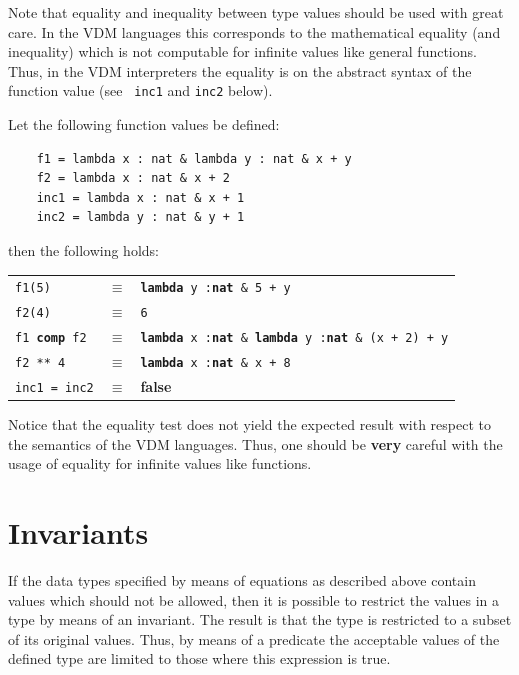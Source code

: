 \documentclass{overturerepchap}
\newcommand{\keyw}[1]{{\bf\ttfamily #1}}
\begin{document}
\begin{description}
  Note that equality and inequality between type values should be used
  with great care. In the VDM languages this corresponds to the
  mathematical equality (and inequality) which is not computable for
  infinite values like general functions. Thus, in the
  VDM interpreters the
  equality is on the abstract syntax of the function value (see {\tt
    inc1} and {\tt inc2} below).



\item[Examples:] Let the following function values be defined:
  \begin{lstlisting}
    f1 = lambda x : nat & lambda y : nat & x + y
    f2 = lambda x : nat & x + 2
    inc1 = lambda x : nat & x + 1
    inc2 = lambda y : nat & y + 1
  \end{lstlisting}
  then the following holds:

  \begin{tabular}{lcl}
    {\tt f1(5)} &$\equiv$& {\tt \keyw{lambda} y :\keyw{nat} \& 5 + y}\\
    {\tt f2(4)} &$\equiv$& {\tt 6}\\
    {\tt f1 \keyw{comp} f2}&$\equiv$& {\tt \keyw{lambda} x :\keyw{nat} \&
      \keyw{lambda} y :\keyw{nat} \& (x + 2) + y}\\
    {\tt f2 ** 4}&$\equiv$& {\tt \keyw{lambda} x :\keyw{nat} \& x + 8}\\
    {\tt inc1 = inc2}&$\equiv$& \keyw{false}\\
  \end{tabular}

  Notice that the equality test does not yield the expected result with
  respect to the semantics of the VDM languages. Thus, one should
  be {\bf very} careful with the usage of equality for infinite values
  like functions.
\end{description}

\section{Invariants}\label{inv}

If the data types specified by means of equations as described above
contain values which should not be allowed, then it is possible to restrict
the values in a type by means of an invariant. The result is that the type
is restricted to a subset of its original values. Thus, by means of a
predicate the acceptable values of the defined type are limited to those
where this expression is true.
\end{document}

